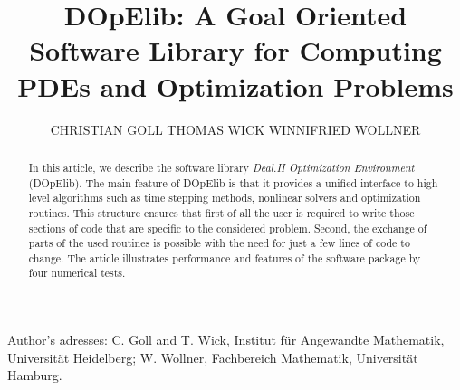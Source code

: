 \documentclass[prodmode,acmtoms]{acmsmall}
\numberwithin{equation}{section}
\begin{document}

\title{DOpElib: A Goal Oriented Software Library for Computing PDEs and Optimization Problems}

\author{CHRISTIAN GOLL
THOMAS WICK
WINNIFRIED WOLLNER
}


\begin{abstract}
In this article, we describe the software library 
\textit{Deal.II Optimization Environment} (DOpElib).
The main feature of DOpElib is that it provides a unified interface to high level algorithms 
such as time stepping methods, nonlinear solvers and optimization routines. This structure ensures 
that first of all the user is required to write those sections of code that are specific to 
the considered problem. Second, the exchange of parts of the used routines is possible 
with the need for just a few lines of code to change.
The article illustrates performance and features 
of the software package by four numerical tests. 
\end{abstract}





\begin{bottomstuff}
Author's adresses: C. Goll {and} T. Wick, Institut f\"ur Angewandte Mathematik, Universit\"at Heidelberg;
W. Wollner, Fachbereich Mathematik, Universit\"at Hamburg.
\end{bottomstuff}
                      

\maketitle


\end{document}
